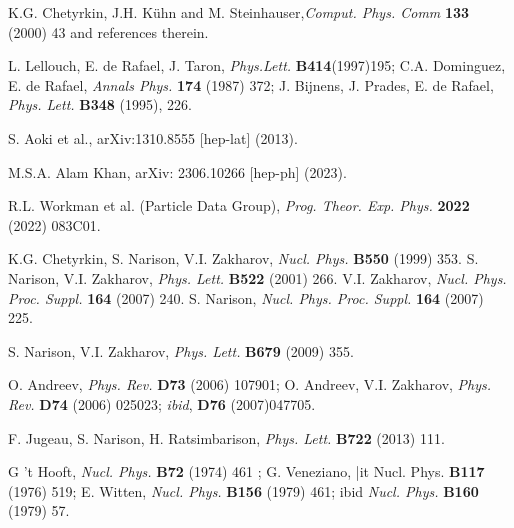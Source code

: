\begin{thebibliography}{999}

 K.G. Chetyrkin,  J.H. K\"uhn and M. Steinhauser,{\it Comput. Phys. Comm} {\bf 133} (2000) 43 and references therein.
 
  L. Lellouch, E. de Rafael, J. Taron, {\it Phys.Lett.} {\bf B414}(1997)195; C.A. Dominguez, E. de Rafael,  {\it Annals Phys.} {\bf 174} (1987) 372; 
J. Bijnens, J. Prades,  E. de Rafael, {\it Phys. Lett.} {\bf B348} (1995), 226. 
 
    S. Aoki et al., arXiv:1310.8555 [hep-lat] (2013).
   
    M.S.A. Alam Khan, arXiv: 2306.10266 [hep-ph] (2023). 
   
  R.L. Workman et al. (Particle Data Group), {\it Prog. Theor. Exp. Phys.}  {\bf 2022} (2022) 083C01.

\end{thebibliography}












 K.G. Chetyrkin, S. Narison, V.I. Zakharov, {\it Nucl. Phys.} 
{\bf B550} (1999)  353.
S. Narison, V.I. Zakharov, {\it  Phys. Lett.} {\bf B522} (2001) 266.
 V.I. Zakharov, {\it Nucl. Phys. Proc. Suppl.} 
{\bf 164} (2007) 240.
S. Narison,  {\it Nucl. Phys. Proc. Suppl.} {\bf 164} (2007) 225.

S. Narison, V.I. Zakharov, {\it Phys. Lett.} {\bf B679} (2009) 355.

	O. Andreev, {\it Phys. Rev.} {\bf D73} (2006) 107901; 
O. Andreev, V.I. Zakharov,  {\it Phys. Rev.} {\bf D74} (2006) 025023; {\it ibid}, {\bf D76} (2007)047705.

	 F. Jugeau, S. Narison, H. Ratsimbarison,  {\it Phys. Lett.}  {\bf  B722} (2013) 111.

G 't Hooft, {\it Nucl. Phys.} {\bf B72} (1974) 461 ; G.
Veneziano, {|it Nucl. Phys.} {\bf B117}  (1976)  519; E. Witten, {\it Nucl. Phys.} {\bf B156}  (1979) 461; ibid {\it Nucl. Phys.} {\bf B160}  (1979)  57.

